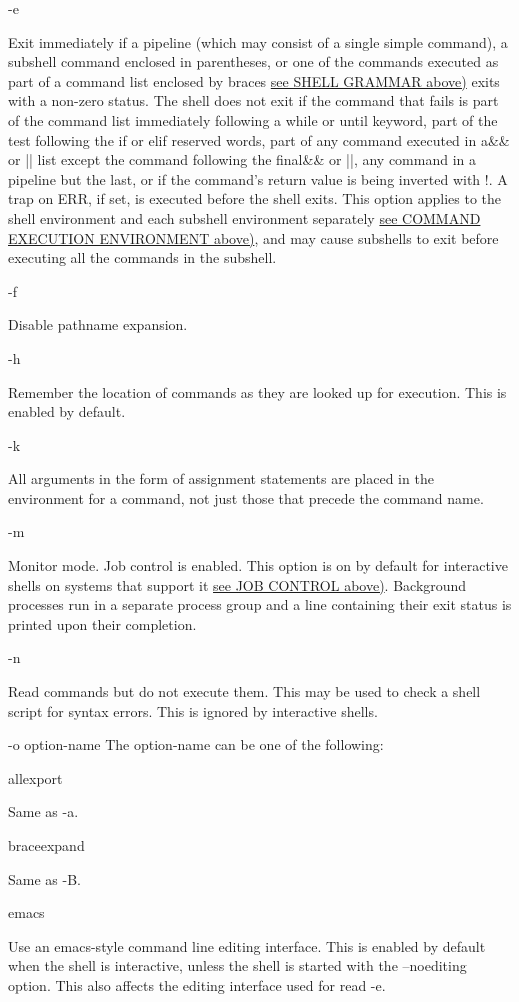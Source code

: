 -e

Exit immediately if a pipeline (which may consist of a single simple command), a subshell command enclosed in parentheses, or one of the commands executed as part of a command list enclosed by braces \hyperref[sec:shellgrammar]{see SHELL GRAMMAR above)} exits with a non-zero status. The shell does not exit if the command that fails is part of the command list immediately following a while or until keyword, part of the test following the if or elif reserved words, part of any command executed in a\&\& or || list except the command following the final\&\& or ||, any command in a pipeline but the last, or if the command's return value is being inverted with !. A trap on ERR, if set, is executed before the shell exits. This option applies to the shell environment and each subshell environment separately \hyperref[sec:commandexecutionenvironment]{see COMMAND EXECUTION ENVIRONMENT above)}, and may cause subshells to exit before executing all the commands in the subshell.

-f

Disable pathname expansion.

-h

Remember the location of commands as they are looked up for execution. This is enabled by default.

-k

All arguments in the form of assignment statements are placed in the environment for a command, not just those that precede the command name.

-m

Monitor mode. Job control is enabled. This option is on by default for interactive shells on systems that support it \hyperref[sec:jobcontrol]{see JOB CONTROL above)}. Background processes run in a separate process group and a line containing their exit status is printed upon their completion.

-n

Read commands but do not execute them. This may be used to check a shell script for syntax errors. This is ignored by interactive shells.

-o option-name
The option-name can be one of the following:

allexport

Same as -a.

braceexpand

Same as -B.

emacs

Use an emacs-style command line editing interface. This is enabled by default when the shell is interactive, unless the shell is started with the --noediting option. This also affects the editing interface used for read -e.


